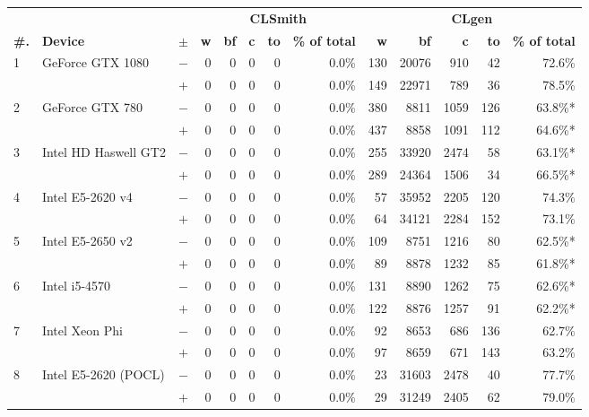 \begin{tabular}{lll | rrrrr | rrrrr }
  \toprule
  & & & \multicolumn{5}{c|}{\textbf{CLSmith}} & \multicolumn{5}{c}{\textbf{CLgen}} \\
  \textbf{\#.} & \textbf{Device} & $\pm$ &
  \textbf{w} & \textbf{bf} & \textbf{c} & \textbf{to} & \textbf{\% of total} &
  \textbf{w} & \textbf{bf} & \textbf{c} & \textbf{to} & \textbf{\% of total} \\
  \midrule
  \multirow{ 2}{*}{1} & \multirow{ 2}{*}{GeForce GTX 1080} & $-$ & 0 & 0 & 0 & 0 & 0.0\%       & 130 & 20076 & 910 & 42 & 72.6\% \\& & $+$ & 0 & 0 & 0 & 0 & 0.0\% & 149 & 22971 & 789 & 36 & 78.5\% \\
\hline
\multirow{ 2}{*}{2} & \multirow{ 2}{*}{GeForce GTX 780} & $-$ & 0 & 0 & 0 & 0 & 0.0\%       & 380 & 8811 & 1059 & 126 & 63.8\%* \\& & $+$ & 0 & 0 & 0 & 0 & 0.0\% & 437 & 8858 & 1091 & 112 & 64.6\%* \\
\hline
\multirow{ 2}{*}{3} & \multirow{ 2}{*}{Intel HD Haswell GT2} & $-$ & 0 & 0 & 0 & 0 & 0.0\%       & 255 & 33920 & 2474 & 58 & 63.1\%* \\& & $+$ & 0 & 0 & 0 & 0 & 0.0\% & 289 & 24364 & 1506 & 34 & 66.5\%* \\
\hline
\multirow{ 2}{*}{4} & \multirow{ 2}{*}{Intel E5-2620 v4} & $-$ & 0 & 0 & 0 & 0 & 0.0\%       & 57 & 35952 & 2205 & 120 & 74.3\% \\& & $+$ & 0 & 0 & 0 & 0 & 0.0\% & 64 & 34121 & 2284 & 152 & 73.1\% \\
\hline
\multirow{ 2}{*}{5} & \multirow{ 2}{*}{Intel E5-2650 v2} & $-$ & 0 & 0 & 0 & 0 & 0.0\%       & 109 & 8751 & 1216 & 80 & 62.5\%* \\& & $+$ & 0 & 0 & 0 & 0 & 0.0\% & 89 & 8878 & 1232 & 85 & 61.8\%* \\
\hline
\multirow{ 2}{*}{6} & \multirow{ 2}{*}{Intel i5-4570} & $-$ & 0 & 0 & 0 & 0 & 0.0\%       & 131 & 8890 & 1262 & 75 & 62.6\%* \\& & $+$ & 0 & 0 & 0 & 0 & 0.0\% & 122 & 8876 & 1257 & 91 & 62.2\%* \\
\hline
\multirow{ 2}{*}{7} & \multirow{ 2}{*}{Intel Xeon Phi} & $-$ & 0 & 0 & 0 & 0 & 0.0\%       & 92 & 8653 & 686 & 136 & 62.7\% \\& & $+$ & 0 & 0 & 0 & 0 & 0.0\% & 97 & 8659 & 671 & 143 & 63.2\% \\
\hline
\multirow{ 2}{*}{8} & \multirow{ 2}{*}{Intel E5-2620 (POCL)} & $-$ & 0 & 0 & 0 & 0 & 0.0\%       & 23 & 31603 & 2478 & 40 & 77.7\% \\& & $+$ & 0 & 0 & 0 & 0 & 0.0\% & 29 & 31249 & 2405 & 62 & 79.0\% \\

\end{tabular}
